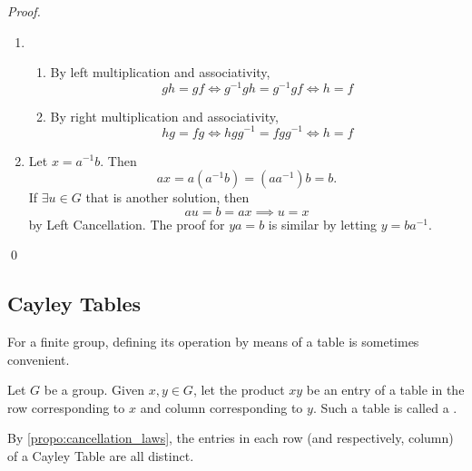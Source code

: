 \documentclass[notoc,notitlepage]{tufte-book}
\begin{document}
\begin{proof}
  \begin{enumerate}
    \item \begin{enumerate}
      \item By left multiplication and associativity,
        \begin{equation*}
          gh = gf \iff g^{-1} gh = g^{-1} gf \iff h = f
        \end{equation*}
      \item By right multiplication and associativity,
        \begin{equation*}
          hg = fg \iff hgg^{-1} = fgg^{-1} \iff h = f
        \end{equation*}
    \end{enumerate}

    \item Let $x = a^{-1} b$. Then
      \begin{equation*}
        a x = a (a^{-1} b) = (aa^{-1}) b = b.
      \end{equation*}
      If $\exists u \in G$ that is another solution, then
      \begin{equation*}
        au = b = ax \implies u = x
      \end{equation*}
      by Left Cancellation. The proof for $ya = b$ is similar by letting $y = ba^{-1}$.
  \end{enumerate}\qed
\end{proof}


\subsection{Cayley Tables} %
\label{sub:cayley_tables}

For a finite group, defining its operation by means of a table is sometimes convenient.

\begin{defn}\label{defn:cayley_table}
  Let $G$ be a group. Given $x, y \in G$, let the product $xy$ be an entry of a table in the row corresponding to $x$ and column corresponding to $y$. Such a table is called a .
\end{defn}

\begin{note}
  By \autoref{propo:cancellation_laws}, the entries in each row (and respectively, column) of a Cayley Table are all distinct.
\end{note}
\end{document}
